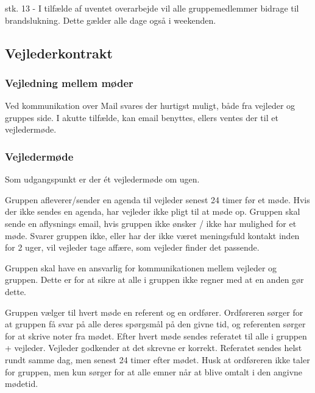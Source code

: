 \documentclass[../main.tex]{subfiles}
\begin{document}
stk. 13 - I tilfælde af uventet overarbejde vil alle gruppemedlemmer bidrage til
brandslukning. Dette gælder alle dage også i weekenden.\\


\subsection{Vejlederkontrakt}

\subsubsection{Vejledning mellem møder}
Ved kommunikation over Mail svares der hurtigst muligt, både fra vejleder og gruppes side.
I akutte tilfælde, kan email benyttes, ellers ventes der til et vejledermøde.

\subsubsection{Vejledermøde}
Som udgangspunkt er der ét vejledermøde om ugen.

Gruppen afleverer/sender en agenda til vejleder senest 24 timer før et møde.
Hvis der ikke sendes en agenda, har vejleder ikke pligt til at møde op. Gruppen
skal sende en aflysnings email, hvis gruppen ikke ønsker / ikke har mulighed
for et møde.
Svarer gruppen ikke, eller har der ikke været meningsfuld kontakt inden
for 2 uger, vil vejleder tage affære, som vejleder finder det passende.

Gruppen skal have en ansvarlig for kommunikationen mellem vejleder og gruppen.
Dette er for at sikre at alle i gruppen ikke regner med at en anden gør dette.

Gruppen vælger til hvert møde en referent og en ordfører.
Ordføreren sørger for at gruppen få svar på alle deres spørgsmål på den
givne tid, og referenten sørger for at skrive noter fra mødet.
Efter hvert møde sendes referatet til alle i gruppen +  vejleder.
Vejleder godkender at det skrevne er korrekt. Referatet sendes helst
rundt samme dag, men senest 24 timer efter mødet. Husk at ordføreren ikke
taler for gruppen, men kun sørger for at alle emner når at blive
omtalt i den angivne mødetid.
\end{document}
